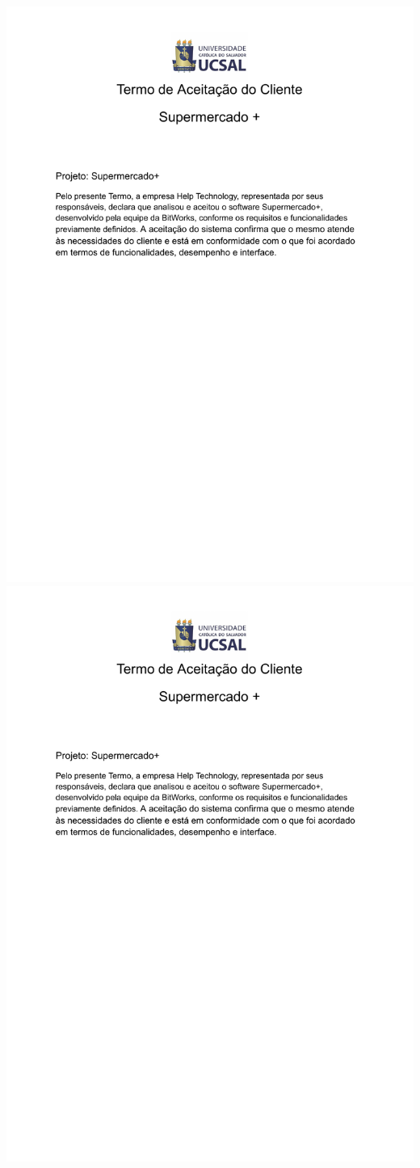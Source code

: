 \documentclass[12pt,oneside,a4paper,article]{abntex2}
\begin{document}
     \includegraphics[page=2, width=\textwidth]{imagens-template/arquivos/Termo de aceite.docx.pdf}
      \includegraphics[page=3, width=\textwidth]{imagens-template/arquivos/Termo de aceite.docx.pdf}
    \vspace{12mm}                                   
                        
\end{document}
